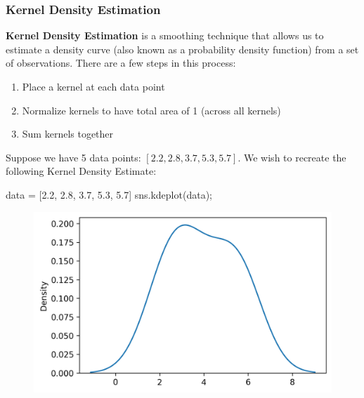 \documentclass[
  letterpaper,
  DIV=11,
  numbers=noendperiod]{scrreprt}
\newenvironment{Shaded}{\begin{snugshade}}{\end{snugshade}}
\newcommand{\FloatTok}[1]{\textcolor[rgb]{0.68,0.00,0.00}{#1}}
\newcommand{\NormalTok}[1]{\textcolor[rgb]{0.00,0.23,0.31}{#1}}
\newcommand{\OperatorTok}[1]{\textcolor[rgb]{0.37,0.37,0.37}{#1}}
\providecommand{\tightlist}{%
  \setlength{\itemsep}{0pt}\setlength{\parskip}{0pt}}\usepackage{longtable,booktabs,array}
\begin{document}
\hypertarget{kernel-density-estimation}{%
\subsubsection{Kernel Density
Estimation}\label{kernel-density-estimation}}

\textbf{Kernel Density Estimation} is a smoothing technique that allows
us to estimate a density curve (also known as a probability density
function) from a set of observations. There are a few steps in this
process:

\begin{enumerate}
\def\labelenumi{\arabic{enumi}.}
\tightlist
\item
  Place a kernel at each data point
\item
  Normalize kernels to have total area of 1 (across all kernels)
\item
  Sum kernels together
\end{enumerate}

Suppose we have 5 data points: \([2.2, 2.8, 3.7, 5.3, 5.7]\). We wish to
recreate the following Kernel Density Estimate:

\begin{Shaded}
\begin{Highlighting}[]
\NormalTok{data }\OperatorTok{=}\NormalTok{ [}\FloatTok{2.2}\NormalTok{, }\FloatTok{2.8}\NormalTok{, }\FloatTok{3.7}\NormalTok{, }\FloatTok{5.3}\NormalTok{, }\FloatTok{5.7}\NormalTok{]}
\NormalTok{sns.kdeplot(data)}\OperatorTok{;}
\end{Highlighting}
\end{Shaded}

\begin{figure}[H]

{\centering \includegraphics{visualization_2/visualization_2_files/figure-pdf/cell-4-output-1.png}

}

\end{figure}
\end{document}

